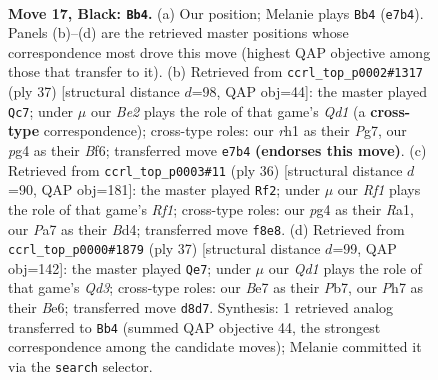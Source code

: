\documentclass[11pt]{article}
\begin{document}
\clearpage

\begin{figure}[p]\centering
\begin{subfigure}{0.46\textwidth}\centering
\resizebox{\linewidth}{!}{%
\newchessgame
\chessboard[
  setfen={r2q1rk1/p3bp1p/4p3/pP1pQ1p1/P2P1PP1/2N4P/2P5/R3K2R b KQ - 0 17},
  showmover=false,
  pgfstyle=straightmove, color=movearrow, markmove={e7-b4}
]}
\caption{}
\end{subfigure}\hfill
\begin{subfigure}{0.46\textwidth}\centering
\resizebox{\linewidth}{!}{%
\newchessgame
\chessboard[
  setfen={r2q1rk1/5pp1/p1np1b1p/2p1p3/2P3P1/2PQ1NBP/PP3P2/R3R1K1 b - - 0 19},
  showmover=false,
  pgfstyle=straightmove, color=movearrow, markmove={d8-c7}
]}
\caption{}
\end{subfigure}
\\[4pt]
\begin{subfigure}{0.46\textwidth}\centering
\resizebox{\linewidth}{!}{%
\newchessgame
\chessboard[
  setfen={1r2r1k1/4ppbp/6p1/pp1pPq2/P2B1P2/2P4P/1P4P1/R2Q1RK1 w - - 0 19},
  showmover=false,
  pgfstyle=straightmove, color=movearrow, markmove={f1-f2}
]}
\caption{}
\end{subfigure}\hfill
\begin{subfigure}{0.46\textwidth}\centering
\resizebox{\linewidth}{!}{%
\newchessgame
\chessboard[
  setfen={r2r2k1/pp3p1p/3qb1p1/3p4/P2Qp2P/1PP1P1P1/5PB1/RR4K1 b - - 0 19},
  showmover=false,
  pgfstyle=straightmove, color=movearrow, markmove={d6-e7}
]}
\caption{}
\end{subfigure}
\caption{\textbf{Move 17, Black: \texttt{Bb4}.} (a) Our position; Melanie plays \texttt{Bb4} (\texttt{e7b4}). Panels (b)--(d) are the retrieved master positions whose correspondence most drove this move (highest QAP objective among those that transfer to it). (b) Retrieved from \texttt{ccrl\_top\_p0002\#1317} (ply 37) [structural distance $d$=98, QAP obj=44]: the master played \texttt{Qc7}; under $\mu$ our \emph{Be2} plays the role of that game's \emph{Qd1} (a \textbf{cross-type} correspondence); cross-type roles: our \emph{r}h1 as their \emph{P}g7, our \emph{p}g4 as their \emph{B}f6; transferred move \texttt{e7b4} \textbf{(endorses this move)}. (c) Retrieved from \texttt{ccrl\_top\_p0003\#11} (ply 36) [structural distance $d$=90, QAP obj=181]: the master played \texttt{Rf2}; under $\mu$ our \emph{Rf1} plays the role of that game's \emph{Rf1}; cross-type roles: our \emph{p}g4 as their \emph{R}a1, our \emph{P}a7 as their \emph{B}d4; transferred move \texttt{f8e8}. (d) Retrieved from \texttt{ccrl\_top\_p0000\#1879} (ply 37) [structural distance $d$=99, QAP obj=142]: the master played \texttt{Qe7}; under $\mu$ our \emph{Qd1} plays the role of that game's \emph{Qd3}; cross-type roles: our \emph{B}e7 as their \emph{P}b7, our \emph{P}h7 as their \emph{B}e6; transferred move \texttt{d8d7}. Synthesis: 1 retrieved analog transferred to \texttt{Bb4} (summed QAP objective 44, the strongest correspondence among the candidate moves); Melanie committed it via the \texttt{search} selector.}
\label{fig:thought-m33}
\end{figure}
\end{document}
